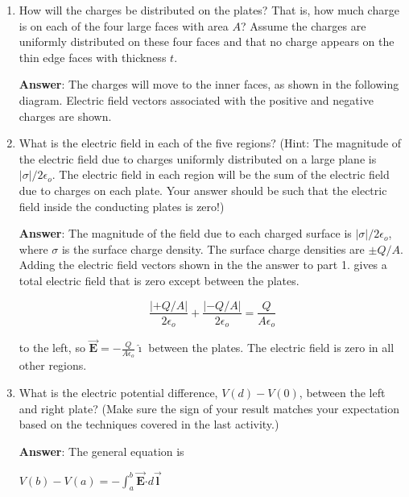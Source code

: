 \documentclass{article}
\newcommand{\ds}[0]{\displaystyle}
\newcommand{\ihat}[0]{\hat{\boldsymbol{\imath}}}
\newcommand{\bfvec}[1]{\vec{\mathbf{#1}}}
\newcommand{\bfcdot}[0]{\boldsymbol{\cdot}}
\begin{document}
\begin{enumerate}

  \item How will the charges be distributed on the plates? That is, how much charge is on each of the four large faces with area $A$? Assume the charges are uniformly distributed on these four faces and that no charge appears on the thin edge faces with thickness $t$.

        \ifsolutions
        {\bf Answer}: The charges will move to the inner faces, as shown in the following diagram. Electric field vectors associated with the positive and negative charges are shown.

        
        \else
        \vskip 36pt
        \fi

  \item What is the electric field in each of the five regions? (Hint: The magnitude of the electric field due to charges uniformly distributed on a large plane is $|\sigma|/2\epsilon_o$. The electric field in each region will be the sum of the electric field due to charges on each plate. Your answer should be such that the electric field inside the conducting plates is zero!)

        \ifsolutions
        {\bf Answer}: The magnitude of the field due to each charged surface is $|\sigma|/2\epsilon_o$, where $\sigma$ is the surface charge density. The surface charge densities are $\pm Q/A$. Adding the electric field vectors shown in the the answer to part 1. gives a total electric field that is zero except between the plates.

        

        $$\frac{|+Q/A|}{2\epsilon_o} + \frac{|-Q/A|}{2\epsilon_o} = \frac{Q}{A\epsilon_o}$$

        to the left, so $\ds\bfvec{E}=-\frac{Q}{A\epsilon_o}\ihat$ between the plates. The electric field is zero in all other regions.
        \else
        \vskip 36pt
        \fi

  \item What is the electric potential difference, $V(d)-V(0)$, between the left and right plate? (Make sure the sign of your result matches your expectation based on the techniques covered in the last activity.)

        \ifsolutions
        {\bf Answer}: The general equation is

        $\ds V(b)-V(a) = -\int_a^b\bfvec{E}\bfcdot d\bfvec{l}$


\end{enumerate}
\end{document}
